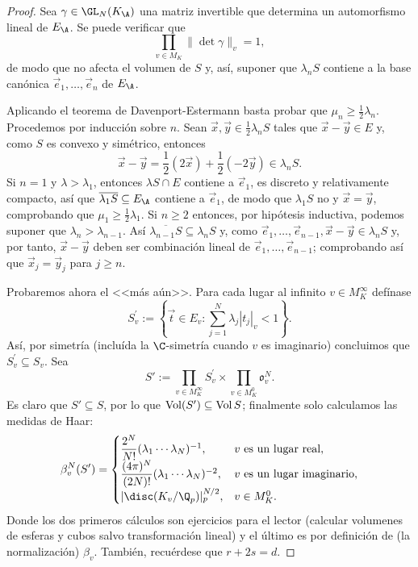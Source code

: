 \documentclass[teoria-numeros.tex]{subfiles}
\begin{document}
\begin{proof}
	Sea $\gamma \in \GL_N(K_\A)$ una matriz invertible que determina un automorfismo lineal de $E_\A$.
	Se puede verificar que
	$$ \prod_{v\in M_K} \|\det \gamma\|_v = 1, $$
	de modo que no afecta el volumen de $S$ y, así, suponer que $\lambda_n S$ contiene a la base canónica $\vec e_1, \dots, \vec e_n$ de $E_\A$.

	Aplicando el teorema de Davenport-Estermann basta probar que $\mu_n \ge \frac{1}{2} \lambda_n$.
	Procedemos por inducción sobre $n$.
	Sean $\vec x, \vec y \in \frac{1}{2} \lambda_n S$ tales que $\vec x - \vec y \in E$ y, como $S$ es convexo y simétrico, entonces
	$$ \vec x - \vec y = \frac{1}{2}(2\vec x) + \frac{1}{2}(-2\vec y) \in \lambda_n S. $$
	Si $n = 1$ y $\lambda > \lambda_1$, entonces $\lambda S \cap E$ contiene a $\vec e_1$, es discreto y relativamente compacto,
	así que $\overline{ \lambda_1 S} \subseteq E_\A$ contiene a $\vec e_1$, de modo que $\lambda_1 S$ no y $\vec x = \vec y$,
	comprobando que $\mu_1 \ge \frac{1}{2} \lambda_1$.
	Si $n \ge 2$ entonces, por hipótesis inductiva, podemos suponer que $\lambda_n > \lambda_{n-1}$.
	Así $\overline{\lambda_{n-1}S} \subseteq \lambda_n S$ y, como $\vec e_1, \dots, \vec e_{n-1}, \vec x - \vec y \in \lambda_n S$ y,
	por tanto, $\vec x - \vec y$ deben ser combinación lineal de $\vec e_1, \dots, \vec e_{n-1}$; comprobando así que $\vec x_j = \vec y_j$ para $j \ge n$.

	Probaremos ahora el <<más aún>>.
	Para cada lugar al infinito $v \in M_K^\infty$ defínase
	$$ S_v^\prime := \left\{ \vec t \in E_v : \sum_{j=1}^{N} \lambda_j |t_j|_v < 1 \right\}. $$
	Así, por simetría (incluída la $\C$-simetría cuando $v$ es imaginario) concluimos que $S_v^\prime \subseteq S_v$.
	Sea
	\[
		S' := \prod_{v \in M_K^\infty} S_v^\prime \times \prod_{v \in M_K^0} \mathfrak{o}_v^N.
	\]
	Es claro que $S' \subseteq S$, por lo que $\operatorname{Vol}(S') \subseteq \operatorname{Vol} S$; finalmente solo calculamos las medidas de Haar:
	\begin{equation*}
		\beta_v^N( S' ) =
		\begin{cases}
			\dfrac{2^N}{N!} (\lambda_1 \cdots \lambda_N)^{-1}, & v \text{ es un lugar real}, \\
			\dfrac{(4\pi)^N}{(2N)!} (\lambda_1 \cdots \lambda_N)^{-2}, & v \text{ es un lugar imaginario}, \\
			|\disc(K_v/\Q_p)|^{N/2}_p, & v \in M_K^0.
		\end{cases}
	\end{equation*}
	Donde los dos primeros cálculos son ejercicios para el lector (calcular volumenes de esferas y cubos salvo transformación lineal)
	y el último es por definición de (la normalización) $\beta_v$.
	También, recuérdese que $r + 2s = d$.
\end{proof}
\end{document}
